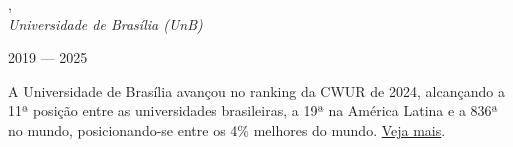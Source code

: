 , \\
\textit{Universidade de Brasília (UnB)}\strut \hfill 2019 --- 2025\\

\vspace*{7pt}

A Universidade de Brasília avançou no ranking da CWUR de 2024, alcançando a 11ª posição entre as universidades brasileiras, a 19ª na América Latina e a 836ª no mundo, posicionando-se entre os 4\% melhores do mundo. \href{https://cwur.org/2024/university-of-brasilia.php}{Veja mais}.

%
%
%
